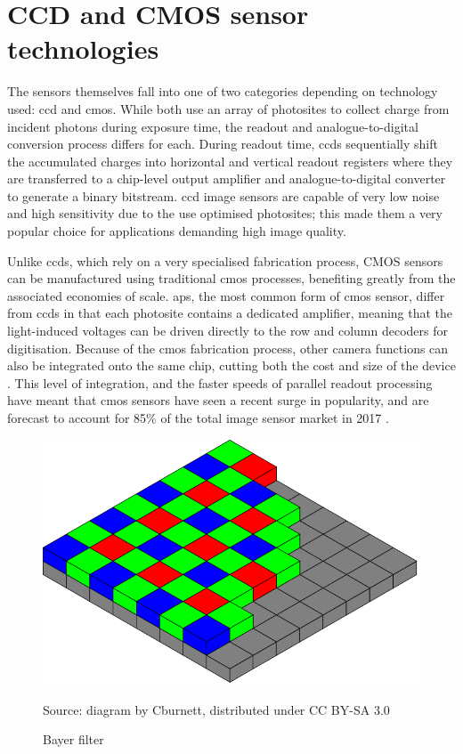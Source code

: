\section{CCD and CMOS sensor technologies}

The sensors themselves fall into one of two categories depending on technology used: \gls{ccd} and \gls{cmos}. While both use an array of photosites to collect charge from incident photons during exposure time, the readout and analogue-to-digital conversion process differs for each. During readout time, \glspl{ccd} sequentially shift the accumulated charges into horizontal and vertical readout registers where they are transferred to a chip-level output amplifier and analogue-to-digital converter to generate a binary bitstream. \gls{ccd} image sensors are capable of very low noise and high sensitivity due to the use optimised photosites; this made them a very popular choice for applications demanding high image quality.

Unlike \glspl{ccd}, which rely on a very specialised fabrication process, CMOS sensors can be manufactured using traditional \gls{cmos} processes, benefiting greatly from the associated economies of scale. \gls{aps}, the most common form of \gls{cmos} sensor, differ from \glspl{ccd} in that each photosite contains a dedicated amplifier, meaning that the light-induced voltages can be driven directly to the row and column decoders for digitisation. Because of the \gls{cmos} fabrication process, other camera functions can also be integrated onto the same chip, cutting both the cost and size of the device \cite{10_ge_2012}.  This level of integration, and the faster speeds of parallel readout processing have meant that \gls{cmos} sensors have seen a recent surge in popularity, and are forecast to account for 85\% of the total image sensor market in 2017 \cite{11_ic_insights_2013}.

\begin{figure}
  \centering
  \includegraphics[width=1\textwidth]{./img/bayer_pattern.png}\par
Source: diagram by Cburnett, distributed under CC BY-SA 3.0
  \caption{Bayer filter}
  \label{fig:bayer_pattern}
\end{figure}


